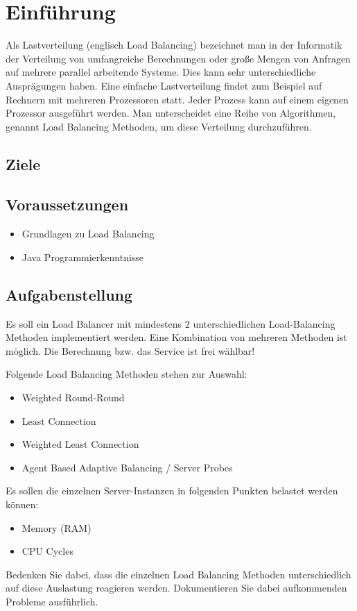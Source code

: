 
\section{Einführung}
Als Lastverteilung (englisch Load Balancing) bezeichnet man in der Informatik der Verteilung von umfangreiche Berechnungen oder große Mengen von Anfragen auf mehrere parallel arbeitende Systeme. Dies kann sehr unterschiedliche Ausprägungen haben. Eine einfache Lastverteilung findet zum Beispiel auf Rechnern mit mehreren Prozessoren statt. Jeder Prozess kann auf einem eigenen Prozessor ausgeführt werden. Man unterscheidet eine Reihe von Algorithmen, genannt Load Balancing Methoden, um diese Verteilung durchzuführen.

\subsection{Ziele}

\subsection{Voraussetzungen}
\begin{itemize}
	\item Grundlagen zu Load Balancing
	\item Java Programmierkenntnisse
\end{itemize}


\subsection{Aufgabenstellung}
Es soll ein Load Balancer mit mindestens 2 unterschiedlichen Load-Balancing Methoden implementiert werden. Eine Kombination von mehreren Methoden ist möglich. Die Berechnung bzw. das Service ist frei wählbar!

Folgende Load Balancing Methoden stehen zur Auswahl:

\begin{itemize}
	\item Weighted Round-Round
	\item Least Connection
	\item Weighted Least Connection
	\item Agent Based Adaptive Balancing / Server Probes
\end{itemize}

Es sollen die einzelnen Server-Instanzen in folgenden Punkten belastet werden können:
\begin{itemize}
	\item Memory (RAM)
	\item CPU Cycles
\end{itemize}

Bedenken Sie dabei, dass die einzelnen Load Balancing Methoden unterschiedlich auf diese Auslastung reagieren werden. Dokumentieren Sie dabei aufkommenden Probleme ausführlich.
\clearpage


